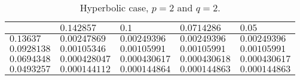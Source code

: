 \begin{table}[!ht]
{        \def\arraystretch{1.25}
        \begin{tabular}{ | C{2cm} || C{2cm} | C{2cm} | C{2cm} | C{2cm} | } %
            \hline
             & $\num{0.142857}$ & $\num{0.1}$ & $\num{0.0714286}$ & $\num{0.05}$ \\
            \hline
            \hline
            $\num{0.13637}$ & $\num{0.00247869}$ & $\num{0.00249396}$ & $\num{0.00249396}$ & $\num{0.00249396}$ \\
            $\num{0.0928138}$ & $\num{0.00105346}$ & $\num{0.00105991}$ & $\num{0.00105991}$ & $\num{0.00105991}$ \\
            $\num{0.0694348}$ & $\num{0.000428047}$ & $\num{0.000430617}$ & $\num{0.000430618}$ & $\num{0.000430617}$ \\
            $\num{0.0493257}$ & $\num{0.000144112}$ & $\num{0.000144864}$ & $\num{0.000144863}$ & $\num{0.000144863}$ \\
            \hline
        \end{tabular}
    }
    \caption{Hyperbolic case, $p = 2$ and $q = 2$.}
\end{table}
\vspace*{\fill}